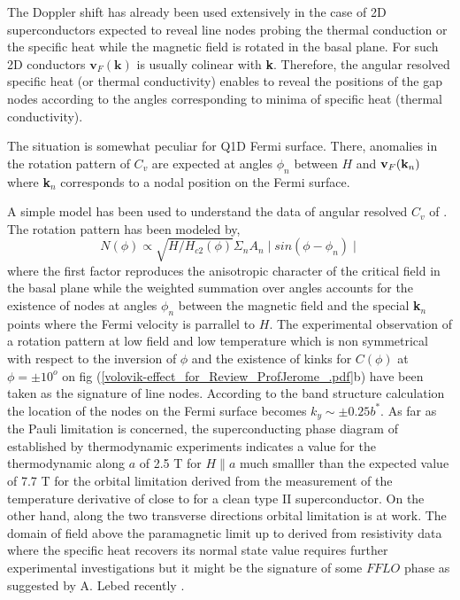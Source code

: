 \documentclass[11pt]{article} %
\begin{document}
The Doppler shift has already been used extensively in the case of 2D superconductors expected to reveal line nodes probing the thermal conduction or the specific heat while the magnetic field is rotated in the basal plane\cite{Yamashita11,Sakakibara07}. For such 2D conductors  $\textbf{v}_F(\textbf{k})$ is usually colinear with \textbf{k}. Therefore,  the  angular resolved specific heat (or thermal conductivity) enables to reveal the positions of the gap nodes according to the angles corresponding to  minima of  specific heat (thermal conductivity)\cite{Yamashita11}.

The situation is somewhat peculiar for Q1D Fermi surface. There, anomalies in the rotation pattern of $C_v$ are expected at angles $\phi_n$ between $H$ and $\textbf{v}_F(\textbf{\textbf{k$_n$}})$
where  \textbf{k$_n$} corresponds to a nodal position  on the Fermi surface.

A simple model has been used to understand the  data of angular resolved $C_v$ of \tmc\cite{Yonezawa12}. The rotation pattern has been modeled  by,
\begin{equation}
N(\phi)\propto \sqrt{H/H_{c2}(\phi)}\Sigma_{n}A_{n}\mid sin(\phi - \phi_{n})\mid
\end{equation}
 where the first factor reproduces the anisotropic character of the critical field in the basal plane while  the weighted summation  over angles accounts for the existence of nodes at angles $\phi_n$ between the magnetic field and the special  \textbf{k$_n$} points where the Fermi velocity is parrallel to $H$.
 The experimental observation of a rotation pattern at low field and low temperature which is non symmetrical with respect to the inversion of  $\phi$ and the  existence of kinks for  $C(\phi)$  at $\phi=\pm 10^o$ on  fig (\ref{volovik-effect_for_Review_ProfJerome_.pdf}b) have been taken as  the signature of line nodes\cite{Yonezawa12}. According to the band structure calculation the location of the nodes on the Fermi surface becomes $k_y\sim\pm0.25b^*$. As far as  the Pauli limitation is concerned, the superconducting phase diagram of \tmc established by thermodynamic experiments indicates a value for the thermodynamic  along $a$ of 2.5 T for $H\parallel a$ much smalller than the expected value of 7.7 T for the orbital limitation derived from the measurement of the temperature derivative of  close to \tc for a clean type II superconductor\cite{Gorkov85}. On the other hand, along the two transverse directions orbital limitation is at work\cite{Yonezawa12}. The domain of field above the paramagnetic limit up to  derived from resistivity data where the specific heat recovers its normal state value  requires further experimental investigations but it might be the signature of some $FFLO$ phase as suggested by A. Lebed recently \cite{Lebed10,Fuseya12,Croitoru13}.
\end{document}

